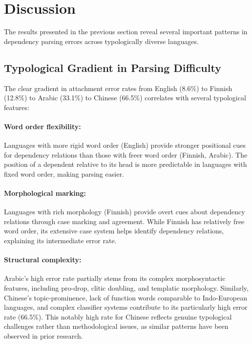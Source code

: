 \documentclass[11pt]{article}
\begin{document}
\section{Discussion}

The results presented in the previous section reveal several important patterns in dependency parsing errors across typologically diverse languages.

\subsection{Typological Gradient in Parsing Difficulty}

The clear gradient in attachment error rates from English (8.6\%) to Finnish (12.8\%) to Arabic (33.1\%) to Chinese (66.5\%) correlates with several typological features:

\paragraph{Word order flexibility:} Languages with more rigid word order (English) provide stronger positional cues for dependency relations than those with freer word order (Finnish, Arabic). The position of a dependent relative to its head is more predictable in languages with fixed word order, making parsing easier.

\paragraph{Morphological marking:} Languages with rich morphology (Finnish) provide overt cues about dependency relations through case marking and agreement. While Finnish has relatively free word order, its extensive case system helps identify dependency relations, explaining its intermediate error rate.

\paragraph{Structural complexity:} Arabic's high error rate partially stems from its complex morphosyntactic features, including pro-drop, clitic doubling, and templatic morphology. Similarly, Chinese's topic-prominence, lack of function words comparable to Indo-European languages, and complex classifier systems contribute to its particularly high error rate (66.5\%). This notably high rate for Chinese reflects genuine typological challenges rather than methodological issues, as similar patterns have been observed in prior research.
\end{document}
